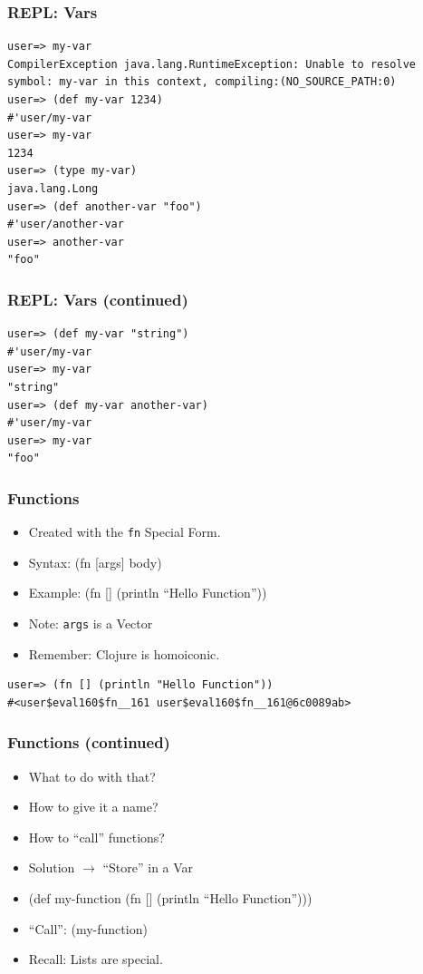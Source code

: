 \documentclass{beamer}
\begin{document}
\begin{frame}[fragile]
\frametitle{REPL: Vars}
\begin{lstlisting}[basicstyle=\scriptsize]
user=> my-var
CompilerException java.lang.RuntimeException: Unable to resolve symbol: my-var in this context, compiling:(NO_SOURCE_PATH:0) 
user=> (def my-var 1234)
#'user/my-var
user=> my-var
1234
user=> (type my-var)
java.lang.Long
user=> (def another-var "foo")
#'user/another-var
user=> another-var
"foo"
\end{lstlisting}
\end{frame}

\begin{frame}[fragile]
\frametitle{REPL: Vars (continued)}
\begin{lstlisting}[basicstyle=\scriptsize]
user=> (def my-var "string")
#'user/my-var
user=> my-var
"string"
user=> (def my-var another-var)
#'user/my-var
user=> my-var
"foo"
\end{lstlisting}
\end{frame}

\begin{frame}[fragile]
\frametitle{Functions}

\begin{itemize}
\item Created with the \texttt{fn} Special Form.
\item Syntax: (fn [args] body)
\item Example: (fn [] (println ``Hello Function''))
\item Note: \texttt{args} is a Vector
\item Remember: Clojure is homoiconic.
\end{itemize}
\begin{lstlisting}[basicstyle=\scriptsize]
user=> (fn [] (println "Hello Function"))
#<user$eval160$fn__161 user$eval160$fn__161@6c0089ab>
\end{lstlisting}
\end{frame}

  \begin{frame}
      \frametitle{Functions (continued)}

      \begin{itemize}
          \item What to do with that?
          \item How to give it a name?
          \item How to ``call'' functions?
          \item Solution $\rightarrow$ ``Store'' in a Var
          \item (def my-function (fn [] (println ``Hello Function'')))
          \item ``Call'': (my-function)
          \item Recall: Lists are special.
      \end{itemize}
  \end{frame}
\end{document}
